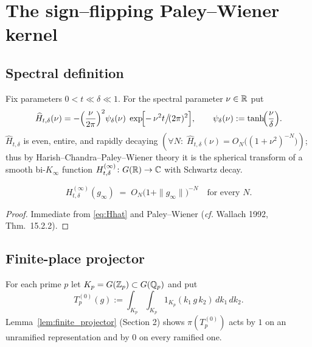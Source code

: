 \section{The sign–flipping Paley–Wiener kernel}

\subsection{Spectral definition}
\label{sec:kernel:spectral}
Fix parameters \(0<t\!\ll\!\delta\!\ll\!1\).  For the spectral
parameter \(\nu\in\Bbb R\) put
\begin{equation}
  \widehat H_{t,\delta}(\nu)
     = -\Bigl(\frac{\nu}{2\pi}\Bigr)^{2}
       \psi_\delta(\nu)\;
       \exp\!\Bigl[-\,\nu^{2}t\big/\!(2\pi)^{2}\Bigr],
  \qquad
  \psi_\delta(\nu):=\tanh\!\Bigl(\frac{\nu}{\delta}\Bigr).
  \label{eq:Hhat}
\end{equation}
\(\widehat H_{t,\delta}\) is even, entire, and rapidly decaying
\((\forall N:\; \widehat H_{t,\delta}(\nu)=O_N\!\bigl((1+\nu^2)^{-N}\bigr))\);
thus by Harish–Chandra--Paley–Wiener theory it is the spherical
transform of a smooth bi-\(K_\infty\) function
\(H_{t,\delta}^{(\infty)}\colon
  G(\Bbb R)\to\Bbb C\) with Schwartz decay.

\begin{lemma}
\label{lem:PW}
\[
   H_{t,\delta}^{(\infty)}(g_\infty)
        \;=\; O_N\!\bigl(1+\|g_\infty\|\bigr)^{-N}
        \quad\text{for every }N.
\]
\end{lemma}
\begin{proof}
Immediate from \eqref{eq:Hhat} and
Paley–Wiener (\emph{cf.} Wallach 1992, Thm.~15.2.2).
\end{proof}

\subsection{Finite-place projector}
\label{sec:kernel:finite}
For each prime \(p\) let \(K_p=G(\Bbb Z_p)\subset G(\Bbb Q_p)\) and put
\begin{equation}
   T_p^{(0)}(g)
      :=\int_{K_p}\!\!\int_{K_p}
           1_{K_p}(k_1\,g\,k_2)\,dk_1\,dk_2 .
   \label{eq:Tp0}
\end{equation}
Lemma~\ref{lem:finite_projector} (Section 2) shows
\(\pi(T_p^{(0)})\) acts by \(1\) on an unramified
representation and by \(0\) on every ramified one.

